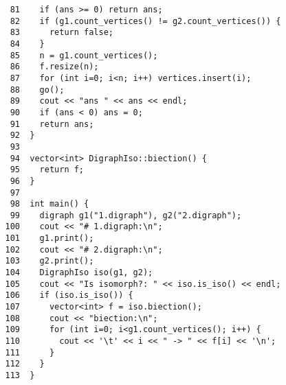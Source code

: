 \begin{verbatim}
    81	  if (ans >= 0) return ans;
    82	  if (g1.count_vertices() != g2.count_vertices()) {
    83	    return false;
    84	  }
    85	  n = g1.count_vertices();
    86	  f.resize(n);
    87	  for (int i=0; i<n; i++) vertices.insert(i);
    88	  go();
    89	  cout << "ans " << ans << endl;
    90	  if (ans < 0) ans = 0;
    91	  return ans;
    92	}
    93	
    94	vector<int> DigraphIso::biection() {
    95	  return f;
    96	}
    97	
    98	int main() {
    99	  digraph g1("1.digraph"), g2("2.digraph");
   100	  cout << "# 1.digraph:\n";
   101	  g1.print();
   102	  cout << "# 2.digraph:\n";
   103	  g2.print();
   104	  DigraphIso iso(g1, g2);
   105	  cout << "Is isomorph?: " << iso.is_iso() << endl;
   106	  if (iso.is_iso()) {
   107	    vector<int> f = iso.biection();
   108	    cout << "biection:\n";
   109	    for (int i=0; i<g1.count_vertices(); i++) {
   110	      cout << '\t' << i << " -> " << f[i] << '\n';
   111	    }
   112	  }
   113	}
\end{verbatim}
